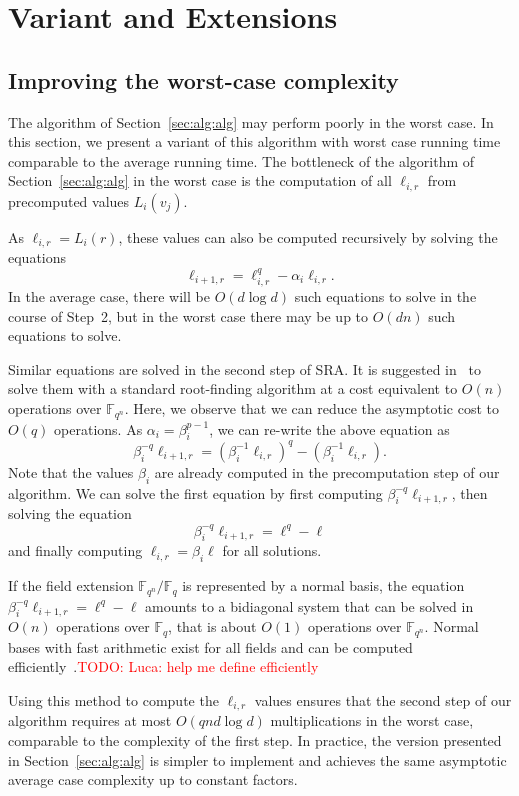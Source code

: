 \documentclass{sig-alternate}
\newcommand{\ff}[1]{\mathbb{F}_{#1}}
\newcommand{\fq}{\ff{q}}
\newcommand{\fqn}{\ff{q^n}}
\newcounter{algo}
\newcommand{\todo}[1]{\textcolor{red}{TODO: #1}}
\begin{document}


\section{Variant and Extensions}


\subsection{Improving the worst-case complexity\label{sec:ext:variant}}

The algorithm of Section~\ref{sec:alg:alg} may perform poorly in the worst case. In this section, we present a variant of this algorithm with worst case running time comparable to the average running time.
%
The bottleneck of the algorithm of Section~\ref{sec:alg:alg} in the worst case is the computation of all $\ell_{i,r}$ from precomputed values $L_i(v_j)$.

As $\ell_{i,r}=L_i(r)$, these values can also be computed recursively by solving the equations
$$\ell_{i+1,r}=\ell_{i,r}^q-\alpha_i\ell_{i,r}.$$
%
In the average case, there will be $O(d\log d)$ such equations to solve in the course of Step~2, but in the worst case there may be up to $O(dn)$ such equations to solve.

Similar equations are solved in the second step of SRA. It is suggested in~\cite{cgUCL-P14} to solve them with a standard root-finding algorithm at a cost equivalent to $O(n)$ operations over $\fqn$.
Here, we observe that we can reduce the asymptotic cost to $O(q)$ operations. As $\alpha_i=\beta_i^{p-1}$, we can re-write the above equation as 
$$\beta_i^{-q}\ell_{i+1,r}=(\beta_i^{-1}\ell_{i,r})^q-(\beta_i^{-1}\ell_{i,r}).$$ 
Note that the values $\beta_i$ are already computed in the precomputation step of our algorithm. We can solve the first equation by first computing $\beta_i^{-q}\ell_{i+1,r}$, then solving the equation 
$$\beta_i^{-q}\ell_{i+1,r}=\ell^q-\ell$$
and finally computing $\ell_{i,r}=\beta_i\ell$ for all solutions.

If the field extension $\fqn/\fq$ is represented by a normal basis, the equation $\beta_i^{-q}\ell_{i+1,r}=\ell^q-\ell$ amounts to a bidiagonal system that can be solved in $O(n)$ operations over $\fq$, that is about $O(1)$ operations over $\fqn$.
%
Normal bases with fast arithmetic exist for all fields and can be computed efficiently~\cite{Couveignes-Lercier}.\todo{Luca: help me define efficiently}

Using this method to compute the $\ell_{i,r}$ values ensures that the second step of our algorithm requires at most $O(qnd\log d)$ multiplications in the worst case, comparable to the complexity of the first step.
%
In practice, the version presented in Section~\ref{sec:alg:alg} is simpler to implement and achieves the same asymptotic average case complexity up to constant factors. 
\end{document}

